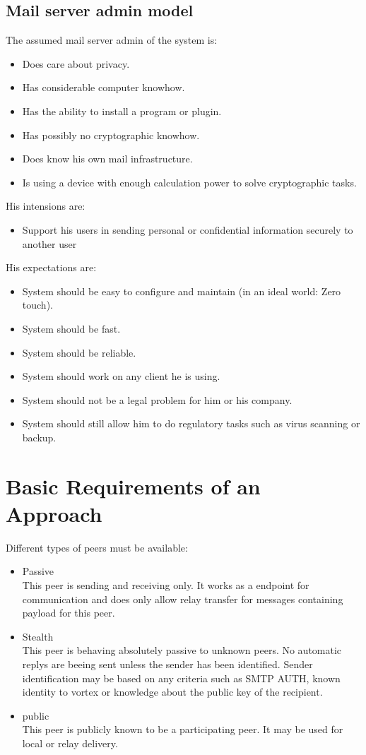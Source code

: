 \subsection{Mail server admin model}
The assumed mail server admin of the system is:
\begin{itemize}
\item Does care about privacy.
\item Has considerable computer knowhow.
\item Has the ability to install a program or plugin.
\item Has possibly no cryptographic knowhow.
\item Does know his own mail infrastructure.
\item Is using a device with enough calculation power to solve cryptographic tasks.
\end{itemize}
His intensions are:
\begin{itemize}
\item Support his users in sending personal or confidential information securely to another user
\end{itemize}
His expectations are:
\begin{itemize}
\item System should be easy to configure and maintain (in an ideal world: Zero touch). 
\item System should be fast.
\item System should be reliable.
\item System should work on any client he is using.
\item System should not be a legal problem for him or his company.
\item System should still allow him to do regulatory tasks such as virus scanning or backup.
\end{itemize}

\section{Basic Requirements of an Approach}
Different types of peers must be available:
\begin{itemize}
  \item Passive\\
	This peer is sending and receiving only. It works as a endpoint for communication and does only allow relay transfer for messages containing payload for this peer.
	\item Stealth\\
	This peer is behaving absolutely passive to unknown peers. No automatic replys are beeing sent unless the sender has been identified. Sender identification may be based on any criteria such as SMTP AUTH, known identity to vortex or knowledge about the public key of the recipient.
	\item public\\
	This peer is publicly known to be a participating peer. It may be used for local or relay delivery.
\end{itemize}

